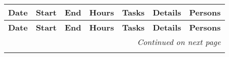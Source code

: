 \renewcommand{\arraystretch}{1.3} %
\footnotesize
\begin{longtable}{@{}p{1.3cm} p{1cm} p{1cm} p{1cm} p{1.5cm} p{4.5cm} p{1.2cm}@{}}
    \toprule
    \textbf{Date} & \textbf{Start} & \textbf{End} & \textbf{Hours} & \textbf{Tasks} & \textbf{Details} & \textbf{Persons} \\
    \midrule
    \endfirsthead

    \toprule
    \textbf{Date} & \textbf{Start} & \textbf{End} & \textbf{Hours} & \textbf{Tasks} & \textbf{Details} & \textbf{Persons} \\
    \midrule
    \endhead

    \midrule
    \multicolumn{7}{r}{\textit{Continued on next page}} \\
    \midrule
    \endfoot

    \bottomrule
    \endlastfoot


\end{longtable}
